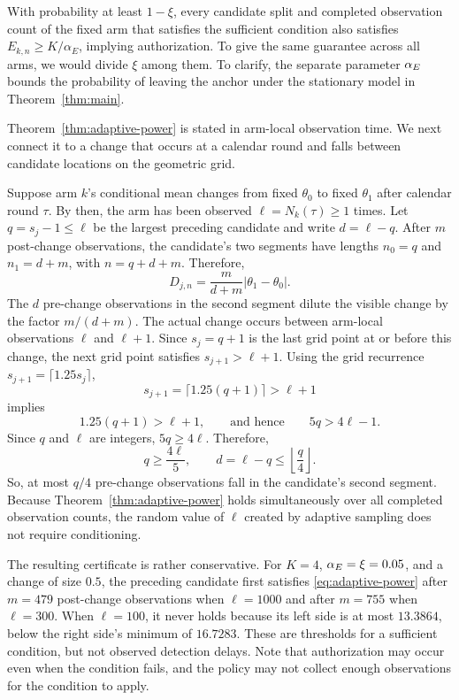 With probability at least $1-\xi$, every candidate split and completed observation
count of the fixed arm that satisfies the sufficient condition also satisfies
$E_{k,n}\ge K/\alpha_E$, implying authorization.
To give the same guarantee across all arms, we would divide $\xi$
among them.
To clarify, the separate parameter $\alpha_E$ bounds the probability of leaving
the anchor under the stationary model in Theorem~\ref{thm:main}.

Theorem~\ref{thm:adaptive-power} is stated in arm-local observation time.
We next connect it to a change that occurs at a calendar round and falls
between candidate locations on the geometric grid.

Suppose arm $k$'s conditional mean changes from fixed $\theta_0$ to fixed
$\theta_1$ after calendar round $\tau$.
By then, the arm has been observed $\ell=N_k(\tau)\geq1$ times.
Let $q=s_j-1\leq\ell$ be the largest preceding candidate and write $d=\ell-q$.
After $m$ post-change observations, the candidate's two segments have
lengths $n_0=q$ and $n_1=d+m$, with $n=q+d+m$.
Therefore,
\[
D_{j,n}
=
\frac{m}{d+m}|\theta_1-\theta_0|.
\]
The $d$ pre-change observations in the second segment dilute the visible
change by the factor $m/(d+m)$.
The actual change occurs between arm-local observations $\ell$ and
$\ell+1$.
Since $s_j=q+1$ is the last grid point at or before this
change, the next grid point satisfies $s_{j+1}>\ell+1$.
Using the grid recurrence $s_{j+1}=\lceil1.25s_j\rceil$,
\[
s_{j+1}
=
\lceil1.25(q+1)\rceil
>
\ell+1
\]
implies
\[
1.25(q+1)>\ell+1,
\qquad\text{and hence}\qquad
5q>4\ell-1.
\]
Since $q$ and $\ell$ are integers, $5q\geq4\ell$. Therefore,
\[
q\geq\frac{4\ell}{5},
\qquad
d=\ell-q\leq\left\lfloor\frac q4\right\rfloor.
\]
So, at most $q/4$ pre-change observations fall in the candidate's
second segment.
Because Theorem~\ref{thm:adaptive-power} holds simultaneously over all
completed observation counts, the random value of $\ell$ created by adaptive
sampling does not require conditioning.

The resulting certificate is rather conservative.
For $K=4$, $\alpha_E=\xi=0.05$, and a change of size $0.5$, the
preceding candidate first satisfies \eqref{eq:adaptive-power} after
$m=479$ post-change observations when $\ell=1000$ and after $m=755$
when $\ell=300$.
When $\ell=100$, it never holds because its left side is
at most $13.3864$, below the right side's minimum of $16.7283$.
These are thresholds for a sufficient condition, but not observed detection delays.
Note that authorization may occur even when the condition fails, and the policy may
not collect enough observations for the condition to apply.

